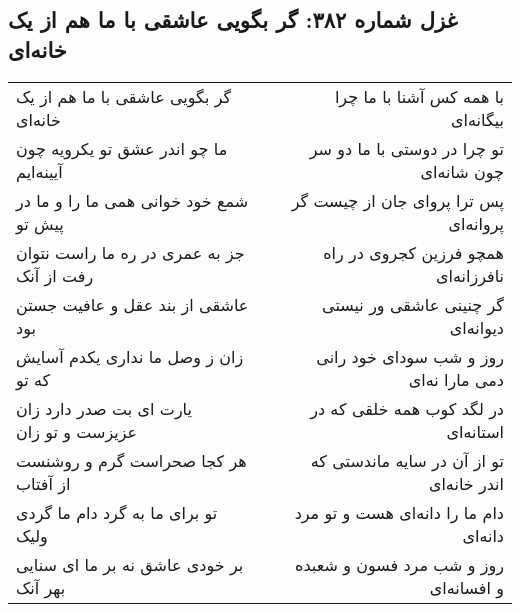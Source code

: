 \begin{center}
\section*{غزل شماره ۳۸۲: گر بگویی عاشقی با ما هم از یک خانه‌ای}
\label{sec:382}
\begin{longtable}{l p{0.5cm} r}
گر بگویی عاشقی با ما هم از یک خانه‌ای
&&
با همه کس آشنا با ما چرا بیگانه‌ای
\\
ما چو اندر عشق تو یکرویه چون آیینه‌ایم
&&
تو چرا در دوستی با ما دو سر چون شانه‌ای
\\
شمع خود خوانی همی ما را و ما در پیش تو
&&
پس ترا پروای جان از چیست گر پروانه‌ای
\\
جز به عمری در ره ما راست نتوان رفت از آنک
&&
همچو فرزین کجروی در راه نافرزانه‌ای
\\
عاشقی از بند عقل و عافیت جستن بود
&&
گر چنینی عاشقی ور نیستی دیوانه‌ای
\\
زان ز وصل ما نداری یکدم آسایش که تو
&&
روز و شب سودای خود رانی دمی مارا نه‌ای
\\
یارت ای بت صدر دارد زان عزیزست و تو زان
&&
در لگد کوب همه خلقی که در استانه‌ای
\\
هر کجا صحراست گرم و روشنست از آفتاب
&&
تو از آن در سایه ماندستی که اندر خانه‌ای
\\
تو برای ما به گرد دام ما گردی ولیک
&&
دام ما را دانه‌ای هست و تو مرد دانه‌ای
\\
بر خودی عاشق نه بر ما ای سنایی بهر آنک
&&
روز و شب مرد فسون و شعبده و افسانه‌ای
\\
\end{longtable}
\end{center}
